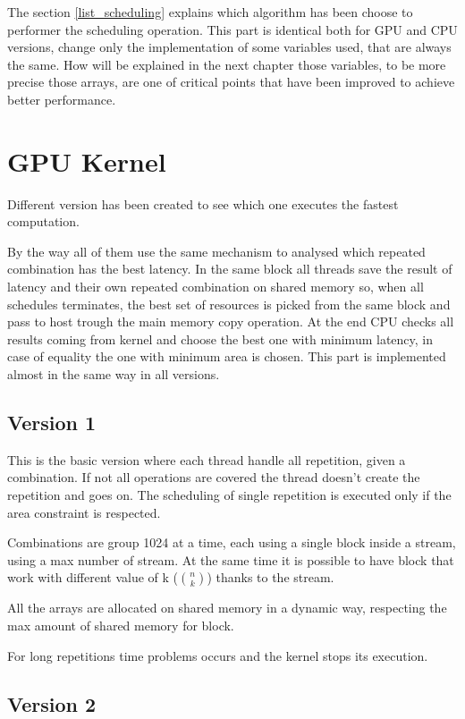 The section \ref{list_scheduling} explains which algorithm has been choose to performer the scheduling operation. 
This part is identical both for GPU and CPU versions, change only the implementation of some variables used, 
that are always the same.
How will be explained in the next chapter those variables, to be more precise those arrays,
are one of critical points that have been improved to achieve better performance.


\section{GPU Kernel}

Different version has been created to see which one executes the fastest computation.

By the way all of them use the same mechanism to analysed which repeated combination has the best latency.
In the same block all threads save the result of latency and their own repeated combination on shared memory so,
when all schedules terminates, the best set of resources is picked from the same block and pass to host trough
the main memory copy operation. At the end CPU checks all results coming from kernel and choose the best one with minimum latency,
in case of equality the one with minimum area is chosen. This part is implemented almost in the same way in all versions.

\subsection{Version 1}

This is the basic version where each thread handle all repetition, given a combination. 
If not all operations are covered the thread doesn't create the repetition and goes on. The scheduling of single repetition
is executed only if the area constraint is respected.

Combinations are group 1024 at a time, each using a single block inside a stream, using a max number of stream. At the same time
it is possible to have block that work with different value of k ($\binom{n}{k}$) thanks to the stream.

All the arrays are allocated on shared memory in a dynamic way, respecting the max amount of shared memory for block.

For long repetitions time problems occurs and the kernel stops its execution.

\subsection{Version 2}

